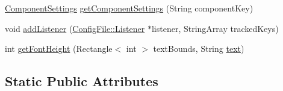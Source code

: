 \begin{DoxyCompactItemize}
\mbox{\hyperlink{classComponentConfigFile_1_1ComponentSettings}{Component\+Settings}} \mbox{\hyperlink{classComponentConfigFile_a708a5f5d09bb6f8bc00857eaa7bbc943}{get\+Component\+Settings}} (String component\+Key)
\item 
void \mbox{\hyperlink{classComponentConfigFile_a6b4babfe3b324fb37a00d9ab9b65f5ec}{add\+Listener}} (\mbox{\hyperlink{classConfigFile_1_1Listener}{Config\+File\+::\+Listener}} $\ast$listener, String\+Array tracked\+Keys)
\item 
int \mbox{\hyperlink{classComponentConfigFile_a21564a3d43977aac7ed217836fe79f73}{get\+Font\+Height}} (Rectangle$<$ int $>$ text\+Bounds, String \mbox{\hyperlink{classComponentConfigFile_a9bf86058d7f64d6ba94770c3dbf3cad8ac27156a5310c2ff67c46cd3cd629eb70}{text}})
\end{DoxyCompactItemize}
\subsection*{Static Public Attributes}
